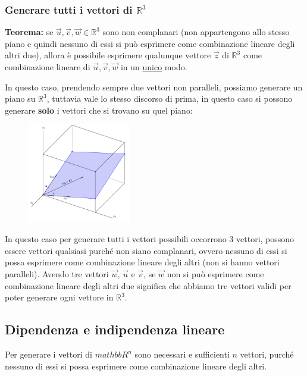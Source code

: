 \documentclass[../main.tex]{subfiles}
\begin{document}
\pagebreak
\subsubsection{Generare tutti i vettori di $\mathbb{R}^3$}
\textbf{Teorema:} se $\vec{u},\vec{v},\vec{w} \in \mathbb{R}^3$ sono non complanari (non appartengono allo stesso piano e quindi nessuno di essi si può  esprimere come combinazione lineare degli altri due), allora è possibile esprimere qualunque vettore $\vec{z}$ di $\mathbb{R}^3$ come combinazione lineare di $\vec{u},\vec{v},\vec{w}$ in un \underline{unico} modo.

In questo caso, prendendo sempre due vettori non paralleli, possiamo generare un piano su $\mathbb{R}^3$, tuttavia vale lo stesso discorso di prima, in questo caso si possono generare \textbf{solo} i vettori che si trovano su quel piano:
\begin{figure}[h]
    \centering
    \includegraphics[width=0.4\textwidth]{../images/combinazioneLineareR3.png}
\end{figure}

In questo caso per generare tutti i vettori possibili occorrono 3 vettori, possono essere vettori qualsiasi purché non siano complanari, ovvero nessuno di essi si possa esprimere come combinazione lineare degli altri (non si hanno vettori paralleli). Avendo tre vettori $\vec{w}$, $\vec{u}$ e $\vec{v}$, se $\vec{w}$ non si può esprimere come combinazione lineare degli altri due significa che abbiamo tre vettori validi per poter generare ogni vettore in $\mathbb{R}^3$.

\vspace{1.5cm}
\subsection{Dipendenza e indipendenza lineare}
Per generare i vettori di $mathbb{R}^n$ sono necessari e sufficienti $n$ vettori, purché nessuno di essi si possa esprimere come combinazione lineare degli altri.
\end{document}
